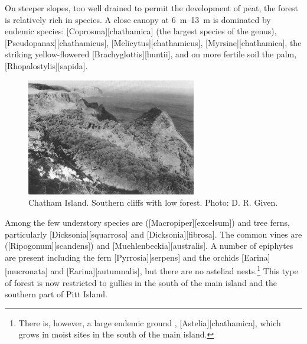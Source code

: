 On steeper slopes, too well drained to permit the development of peat, the forest is relatively rich in species.
A close canopy at \SIrange{6}{13}{\metre} is dominated by endemic species: [Coprosma][chathamica] (the largest species of the genus), [Pseudopanax][chathamicus], [Melicytus][chathamicus], [Myrsine][chathamica], the striking yellow-flowered [Brachyglottis][huntii], and on more fertile soil the  palm, [Rhopalostylis][sapida].

\begin{figure}
	\includegraphics[width=0.66\textwidth]{graphics/figure118chatham-island.jpg}
	\centering
	\caption[Chatham Island, southern cliffs]{Chatham Island.
	Southern cliffs with low forest.
	Photo: D. R. Given.}%
	\label{fig:118chatham-island}
\end{figure}

Among the few understory species are  ([Macropiper][excelsum]) and tree ferns, particularly [Dicksonia][squarrosa] and [Dicksonia][fibrosa].
The common vines are  ([Ripogonum][scandens]) and [Muehlenbeckia][australis].
A number of epiphytes are present including the fern [Pyrrosia][serpens] and the orchids [Earina][mucronata] and [Earina][autumnalis], but there are no asteliad nests.\footnote{There is, however, a large endemic ground , [Astelia][chathamica], which grows in moist sites in the south of the main island.}
This type of forest is now restricted to gullies in the south of the main island and the southern part of Pitt Island.

